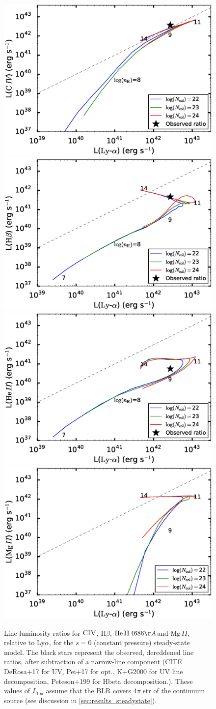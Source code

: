 \documentclass[paper=a4, fontsize=11pt]{scrartcl} %
\numberwithin{equation}{section} %
\numberwithin{figure}{section} %
\numberwithin{table}{section} %
\newcommand{\lline}{\ensuremath{L_{\mathrm{line}}}}
\newcommand{\lya}{\ensuremath{\mathrm{Ly}\alpha}}
\newcommand{\civ}{\ensuremath{\mathrm{C}\textsc{IV}}}
\newcommand{\hbeta}{\ensuremath{\mathrm{H}\beta}}
\newcommand{\heop}{\ensuremath{\mathrm{He}\,\textsc{II}\,4686\AA}}
\newcommand{\mgii}{\ensuremath{\mathrm{Mg}\,\mathit{II}}}
\begin{document}
\begin{figure}
	\centering
	\includegraphics[width=0.49\linewidth]{L_lya_civ}
	\includegraphics[width=0.49\linewidth]{L_lya_hbeta}
	\includegraphics[width=0.49\linewidth]{L_lya_he4686}
	\includegraphics[width=0.49\linewidth]{L_lya_mgii}
	\caption{Line luminosity ratios for \civ, \hbeta, \heop and \mgii, relative to \lya, for the $s=0$ (constant pressure) steady-state model. The black stars represent the observed, dereddened line ratios, after subtraction of a narrow-line component (CITE DeRosa+17 for UV, Pei+17 for opt., K+G2000 for UV line decomposition, Peteson+199 for Hbeta decomposition.). These values of \lline\,assume that the BLR covers $4\pi$ str of the continuum source (see discussion in \ref{sec:results_steadystate}).}
	\label{fig:line_lumins}
\end{figure}
\end{document}
